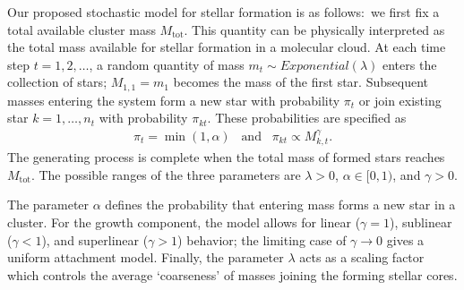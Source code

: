 \documentclass[ejs]{imsart}
\numberwithin{equation}{section}
\theoremstyle{plain}
\newcommand{\Mtot}{M_{\text{tot}}}
\begin{document}
Our proposed stochastic model for stellar formation is as follows:~we first fix a total available cluster mass $\Mtot$. 
This quantity can be physically interpreted as the total mass available for stellar formation in a molecular cloud. 
At each time step $t = 1, 2, \ldots$, a random quantity of mass $m_t \sim Exponential(\lambda)$ enters the collection of stars; $M_{1,1} = m_1$ becomes the mass of the first star.
Subsequent masses entering the system form a new star with probability $\pi_t$ or join existing star $k = 1, \ldots, n_t$ with probability $\pi_{kt}$.
These probabilities are specified as
\begin{align}
	\pi_t = \min \left (1, \alpha \right ) \;\;\; \text{and} \;\;\; \pi_{kt} \propto M_{k,t}^{\gamma}\text{.}
\label{eq:PAstars}
\end{align}
The generating process is complete when the total mass of formed stars reaches $\Mtot$. 
The possible ranges of the three parameters are $\lambda > 0$, $\alpha \in [0,1)$, and $\gamma > 0$. 

The parameter $\alpha$ defines the probability that entering mass forms a new star in a cluster.  For the growth component, the model allows for linear ($\gamma = 1$), sublinear ($\gamma < 1$), and superlinear ($\gamma > 1$) behavior; the limiting case of $\gamma \to 0$ gives a uniform attachment model.  Finally, the parameter $\lambda$ acts as a scaling factor which controls the average `coarseness' of masses joining the forming stellar cores. 
\end{document}
